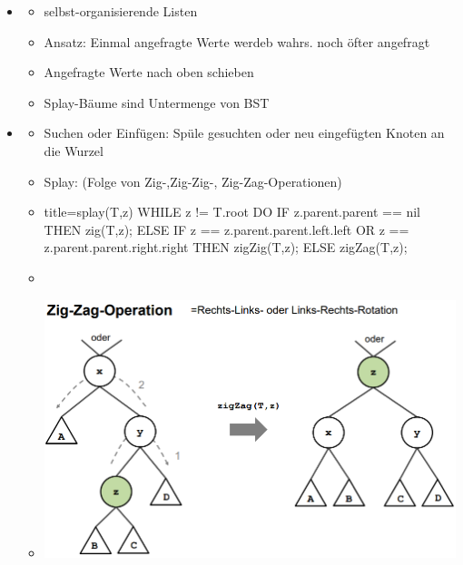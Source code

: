 \documentclass[
    12pt,
    a4paper,
    ngerman,
    color=3b,%
    marginpar=false,
    colorback=false,
    leqno,
]{tudaexercise}
\begin{document}
    \begin{itemize}
        \item {}
            \begin{itemize}
                \item selbst-organisierende Listen
                \item Ansatz: Einmal angefragte Werte werdeb wahrs. noch öfter angefragt
                \item Angefragte Werte nach oben schieben
                \item Splay-Bäume sind Untermenge von BST
            \end{itemize}
        
        \item {}
            \begin{itemize}
                \item Suchen oder Einfügen: Spüle gesuchten oder neu eingefügten Knoten an die Wurzel
                \item Splay: (Folge von Zig-,Zig-Zig-, Zig-Zag-Operationen)
                \item []
                    \begin{ccode}[autogobble]{title={splay(T,z)}}
                    WHILE z != T.root DO
                        IF z.parent.parent == nil THEN
                            zig(T,z);
                        ELSE
                            IF z == z.parent.parent.left.left OR
                               z == z.parent.parent.right.right THEN
                               zigZig(T,z);
                            ELSE
                                zigZag(T,z);
                    \end{ccode}
                \item[]
                \item[] \includegraphics[width=12cm]{pictures/zigzag.PNG}

\end{itemize}
\end{itemize}
\end{document}
